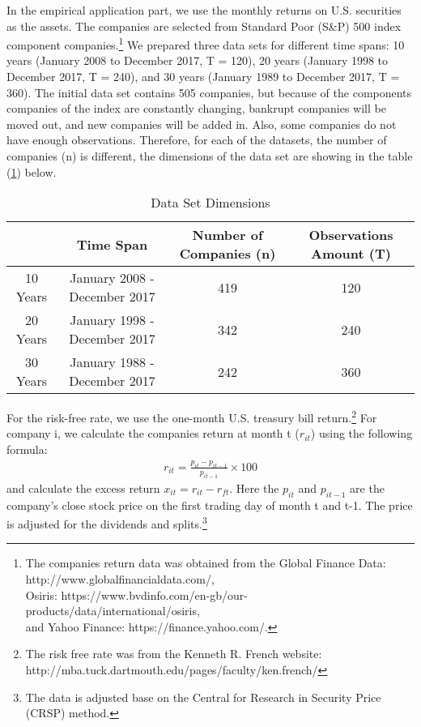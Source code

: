 In the empirical application part, we use the monthly returns on U.S. securities as the assets.
The companies are selected from Standard Poor (S\&P) 500 index component companies.\footnote{The companies return data was obtained from the Global Finance Data: http://www.globalfinancialdata.com/,\\ Osiris: https://www.bvdinfo.com/en-gb/our-products/data/international/osiris, \\and Yahoo Finance: https://finance.yahoo.com/.}
We prepared three data sets for different time spans: 10 years (January 2008 to December 2017, T = 120), 20 years (January 1998 to December 2017, T  = 240), and 30 years (January 1989 to December 2017, T = 360).
The initial data set contains 505 companies, but because of the components companies of the index are constantly changing, bankrupt companies will be moved out, and new companies will be added in.
Also, some companies do not have enough observations.
Therefore, for each of the datasets, the number of companies (n) is different, the dimensions of the data set are showing in the table (\ref{Data_set}) below.

\begin{table}[h]
	\centering
		\caption{Data Set Dimensions}
			\label{Data_set}
	\begin{tabular}{c|ccc}
		\hline
		& Time Span                    & Number of Companies (n) & Observations Amount (T) \\ \hline
		10 Years & January 2008 - December 2017 & 419                  & 120                     \\
		20 Years & January 1998 - December 2017 & 342                  & 240                     \\
		30 Years & January 1988 - December 2017 & 242                  & 360                     \\ \hline
	\end{tabular}
\end{table}
For the risk-free rate, we use the one-month U.S. treasury bill return.\footnote{ The risk free rate was from the Kenneth R. French website: http://mba.tuck.dartmouth.edu/pages/faculty/ken.french/}
For company i, we calculate the companies return at month t ($r_{it}$) using the following formula:
\begin{align*}
r_{it} = \frac{p_{i t} - p_{i t-1}}{p_{i t-1}}\times 100
\end{align*}
and calculate the excess return $x_{it} = r_{it} - r_{ft}$.
Here the $p_{it}$ and $p_{i t-1}$ are the company's close stock price on the first trading day of month t and t-1.
The price is adjusted for the dividends and splits.\footnote{The data is adjusted base on the Central for Research in Security Price (CRSP) method.}

